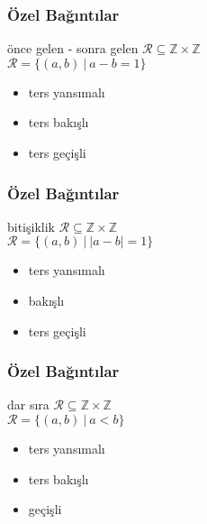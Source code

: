 \documentclass[dvipsnames]{beamer}
\theoremstyle{definition}
\theoremstyle{example}
\theoremstyle{plain}
\begin{document}

\begin{frame}
  \frametitle{Özel Bağıntılar}

  \begin{block}{önce gelen - sonra gelen}
    $\mathcal{R} \subseteq \mathbb{Z} \times \mathbb{Z}$\\
    $\mathcal{R} = \{(a,b)~|~a-b=1\}$

    \medskip
    \begin{itemize}
      \item ters yansımalı
      \item ters bakışlı
      \item ters geçişli
    \end{itemize}
  \end{block}
\end{frame}

\begin{frame}
  \frametitle{Özel Bağıntılar}

  \begin{block}{bitişiklik}
    $\mathcal{R} \subseteq \mathbb{Z} \times \mathbb{Z}$\\
    $\mathcal{R} = \{(a,b)~|~|a-b|=1\}$

    \medskip
    \begin{itemize}
      \item ters yansımalı
      \item bakışlı
      \item ters geçişli
    \end{itemize}
  \end{block}
\end{frame}

\begin{frame}
  \frametitle{Özel Bağıntılar}

  \begin{block}{dar sıra}
    $\mathcal{R} \subseteq \mathbb{Z} \times \mathbb{Z}$\\
    $\mathcal{R} = \{(a,b)~|~a<b\}$

    \medskip
    \begin{itemize}
      \item ters yansımalı
      \item ters bakışlı
      \item geçişli
    \end{itemize}
  \end{block}
\end{frame}
\end{document}
